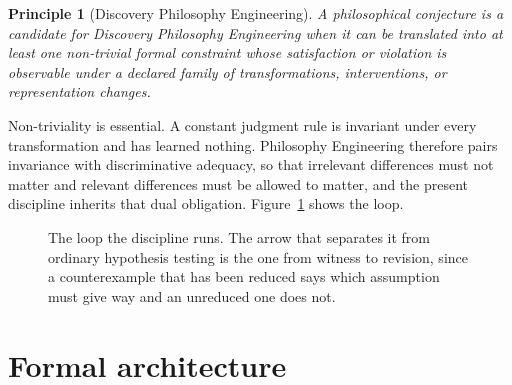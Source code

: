 \documentclass[11pt]{article}
\newtheorem{principle}{Principle}
\theoremstyle{remark}
\begin{document}
\begin{principle}[Discovery Philosophy Engineering]
A philosophical conjecture is a candidate for Discovery Philosophy Engineering when
it can be translated into at least one non-trivial formal constraint whose
satisfaction or violation is observable under a declared family of transformations,
interventions, or representation changes.
\end{principle}

Non-triviality is essential. A constant judgment rule is invariant under every
transformation and has learned nothing. Philosophy Engineering therefore pairs
invariance with discriminative adequacy, so that irrelevant differences must not
matter and relevant differences must be allowed to matter, and the present
discipline inherits that dual obligation. Figure~\ref{fig:loop} shows the loop.

\begin{figure}[t]
\centering
{}
\caption{The loop the discipline runs. The arrow that separates it from ordinary
hypothesis testing is the one from witness to revision, since a counterexample that
has been reduced says which assumption must give way and an unreduced one does
not.}
\label{fig:loop}
\end{figure}

\section{Formal architecture}
\end{document}
